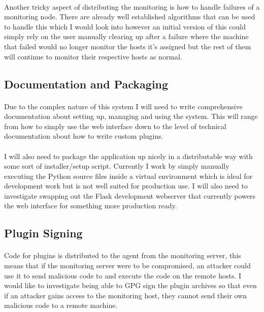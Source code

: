 \documentclass[bsc,logo,twoside]{infthesis}
\begin{document}
\paragraph*{}
	Another tricky aspect of distributing the monitoring is how to handle failures
	of a monitoring node.  There are already well established algorithms that can
	be used to handle this which I would look into however an initial version of
	this could simply rely on the user manually clearing up after a failure where
	the machine that failed would no longer monitor the hosts it's assigned but
	the rest of them will continue to monitor their respective hosts as normal.
	
\subsection{Documentation and Packaging}
\paragraph*{}
	Due to the complex nature of this system I will need to write comprehensive
	documentation about setting up, managing and using the system.  This will
	range from how to simply use the web interface down to the level of technical
	documentation about how to write custom plugins.
	
\paragraph*{}
	I will also need to package the application up nicely in a distributable way
	with some sort of installer/setup script.  Currently I work by simply manually
	executing the Python source files inside a virtual environment which is ideal
	for development work but is not well suited for production use.  I will also
	need to investigate swapping out the Flask development webserver that
	currently powers the web interface for something more production ready.
	
\subsection{Plugin Signing}
\paragraph*{}
	Code for plugins is distributed to the agent from the monitoring server, this
	means that if the monitoring server were to be compromised, an attacker could
	use it to send malicious code to and execute the code on the remote hosts. I
	would like to investigate being able to GPG sign the plugin archives so that
	even if an attacker gains access to the monitoring host, they cannot send
	their own malicious code to a remote machine.	
	
\end{document}
